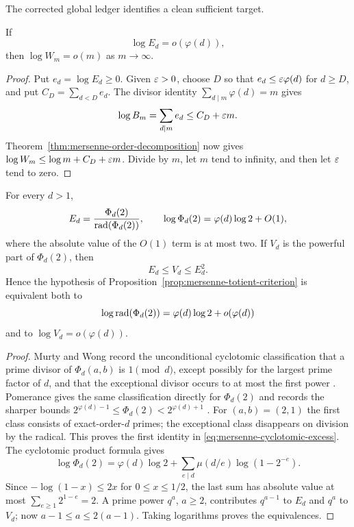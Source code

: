The corrected global ledger identifies a clean sufficient target.

\begin{proposition}
\label{prop:mersenne-totient-criterion}
If
\[
                         \log E_d=o(\varphi(d)),
\]
then $\log W_m=o(m)$ as $m\to\infty$.
\end{proposition}

\begin{proof}
Put $e_d=\log E_d\ge0$.  Given $\varepsilon>0$, choose $D$ so that
$e_d\le\varepsilon\varphi(d)$ for $d\ge D$, and put
$C_D=\sum_{d<D}e_d$.  The divisor identity
$\sum_{d\mid m}\varphi(d)=m$ gives
\[
 \log B_m=\sum_{d\mid m}e_d\le C_D+\varepsilon m.
\]
Theorem~\ref{thm:mersenne-order-decomposition} now gives
$\log W_m\le\log m+C_D+\varepsilon m$.  Divide by $m$, let $m$ tend to infinity,
and then let $\varepsilon$ tend to zero.
\end{proof}

\begin{proposition}
\label{prop:mersenne-cyclotomic-reformulation}
For every $d>1$,
\begin{equation}\label{eq:mersenne-cyclotomic-excess}
 E_d=\frac{\Phi_d(2)}{\operatorname{rad}(\Phi_d(2))},\qquad
 \log\Phi_d(2)=\varphi(d)\log2+O(1),
\end{equation}
where the absolute value of the $O(1)$ term is at most two.  If $V_d$ is
the powerful part of $\Phi_d(2)$, then
\[
                         E_d\le V_d\le E_d^2.
\]
Hence the hypothesis of
Proposition~\ref{prop:mersenne-totient-criterion} is equivalent both to
\[
 \log\operatorname{rad}(\Phi_d(2))=\varphi(d)\log2+o(\varphi(d))
\]
and to $\log V_d=o(\varphi(d))$.
\end{proposition}

\begin{proof}
Murty and Wong record the unconditional cyclotomic classification that a
prime divisor of $\Phi_d(a,b)$ is $1\pmod d$, except possibly for the largest
prime factor of $d$, and that the exceptional divisor occurs to at most the
first power \cite{MurtyWong2002}.  Pomerance gives the same classification
directly for $\Phi_d(2)$ and records the sharper bounds
$2^{\varphi(d)-1}\le\Phi_d(2)<2^{\varphi(d)+1}$
\cite{PomeranceCyclotomic2025}.  For $(a,b)=(2,1)$ the first class consists
of exact-order-$d$ primes; the exceptional class disappears on division by
the radical.  This proves the first identity in
\eqref{eq:mersenne-cyclotomic-excess}.  The cyclotomic product formula gives
\[
 \log\Phi_d(2)=\varphi(d)\log2+
   \sum_{e\mid d}\mu(d/e)\log(1-2^{-e}).
\]
Since $-\log(1-x)\le2x$ for $0\le x\le1/2$, the last sum has absolute value
at most $\sum_{e\ge1}2^{1-e}=2$.  A prime power $q^a$, $a\ge2$, contributes
$q^{a-1}$ to $E_d$ and $q^a$ to $V_d$; now
$a-1\le a\le2(a-1)$.  Taking logarithms proves the equivalences.
\end{proof}

